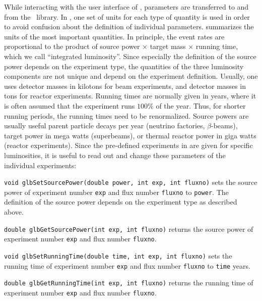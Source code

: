 While interacting with the user interface of \GLOBES , parameters are transferred to and from the \GLOBES\ library. In \GLOBES , one set of units 
for each type of quantity is used in order to avoid confusion about the definition of individual parameters.  summarizes the units of the most important quantities. In principle, the event rates are
proportional to the product of source power $\times$ target mass $\times$
 running time, which we call ``integrated luminosity''. Since especially the
 definition of the source power depends on the experiment type, the quantities of the three luminosity components
 are not unique and depend on the experiment definition. Usually,
 one uses detector masses in kilotons for beam experiments,
 and detector masses in tons for reactor experiments. Running times
 are normally given in years, where it is often assumed that the 
 experiment runs $100\%$ of the year. Thus, for shorter running periods,
 the running times need to be renormalized. Source powers are
 usually useful parent particle decays per year (neutrino factories,
 $\beta$-beams), target power in mega watts (superbeams), or thermal
 reactor power in giga watts (reactor experiments).
%
Since the pre-defined experiments in  are given for specific luminosities, it is useful to read out and change these
 parameters of the individual experiments:
\begin{function}
{\tt void glbSetSourcePower(double power, int exp, int fluxno)}
 sets the source power of experiment number {\tt exp} and flux number
 {\tt fluxno} to {\tt power}. The definition of the source power depends on the experiment type as described above.
\end{function}
\begin{function}
{\tt double glbGetSourcePower(int exp, int fluxno)}
 returns the source power of experiment number {\tt exp} and flux number
 {\tt fluxno}. 
\end{function}
\begin{function}
{\tt void glbSetRunningTime(double time, int exp, int fluxno)}
 sets the running time of experiment number {\tt exp} and flux number
 {\tt fluxno} to {\tt time} years.
\end{function}
\begin{function}
{\tt double glbGetRunningTime(int exp, int fluxno)}
 returns the running time of experiment number {\tt exp} and flux number
 {\tt fluxno}.
\end{function}
